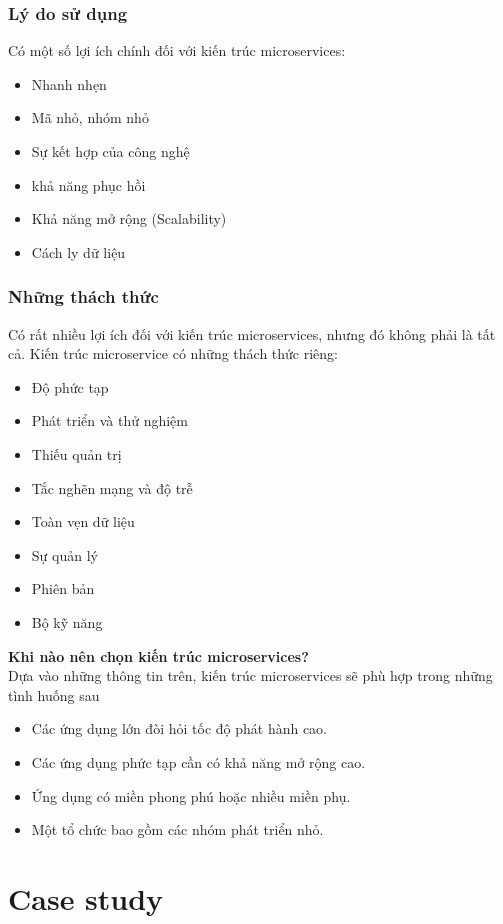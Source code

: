 \subsubsection{Lý do sử dụng}
\noindent Có một số lợi ích chính đối với kiến trúc microservices:
\begin{itemize}
    \item Nhanh nhẹn
    \item Mã nhỏ, nhóm nhỏ
    \item Sự kết hợp của công nghệ
    \item khả năng phục hồi
    \item Khả năng mở rộng (Scalability)
    \item Cách ly dữ liệu
\end{itemize}
\subsubsection{Những thách thức}
\noindent Có rất nhiều lợi ích đối với kiến trúc microservices, nhưng đó không phải là tất cả. Kiến trúc microservice có những thách thức riêng:
\begin{itemize}
    \item Độ phức tạp
    \item Phát triển và thử nghiệm
    \item Thiếu quản trị
    \item Tắc nghẽn mạng và độ trễ
    \item Toàn vẹn dữ liệu
    \item Sự quản lý
    \item Phiên bản
    \item Bộ kỹ năng    
\end{itemize}
\textbf{Khi nào nên chọn kiến trúc microservices?}\\[0.5cm]
\noindent Dựa vào những thông tin trên, kiến trúc microservices sẽ phù hợp trong những tình huống sau
\begin{itemize}
    \item Các ứng dụng lớn đòi hỏi tốc độ phát hành cao.
    \item Các ứng dụng phức tạp cần có khả năng mở rộng cao.
    \item Ứng dụng có miền phong phú hoặc nhiều miền phụ.
    \item Một tổ chức bao gồm các nhóm phát triển nhỏ.    
\end{itemize}

\newpage
\section{Case study}
